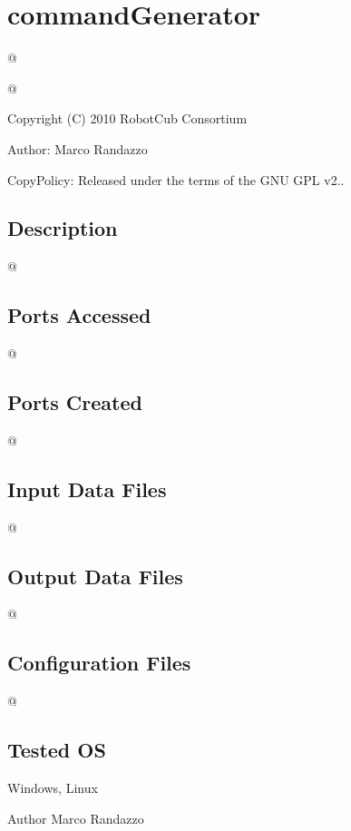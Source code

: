 \section{command\+Generator}
\label{group__commandGenerator}


@  


@ 

Copyright (C) 2010 Robot\+Cub Consortium

Author\+: Marco Randazzo

Copy\+Policy\+: Released under the terms of the G\+N\+U G\+P\+L v2..\hypertarget{group__laserScannerGui_intro_sec}{}\subsection{Description}\label{group__laserScannerGui_intro_sec}
@\hypertarget{group__laserScannerGui_portsa_sec}{}\subsection{Ports Accessed}\label{group__laserScannerGui_portsa_sec}
@\hypertarget{group__laserScannerGui_portsc_sec}{}\subsection{Ports Created}\label{group__laserScannerGui_portsc_sec}
@\hypertarget{group__laserScannerGui_in_files_sec}{}\subsection{Input Data Files}\label{group__laserScannerGui_in_files_sec}
@\hypertarget{group__laserScannerGui_out_data_sec}{}\subsection{Output Data Files}\label{group__laserScannerGui_out_data_sec}
@\hypertarget{group__laserScannerGui_conf_file_sec}{}\subsection{Configuration Files}\label{group__laserScannerGui_conf_file_sec}
@\hypertarget{group__laserScannerGui_tested_os_sec}{}\subsection{Tested O\+S}\label{group__laserScannerGui_tested_os_sec}
Windows, Linux

\begin{DoxyAuthor}{Author}
Marco Randazzo 
\end{DoxyAuthor}
